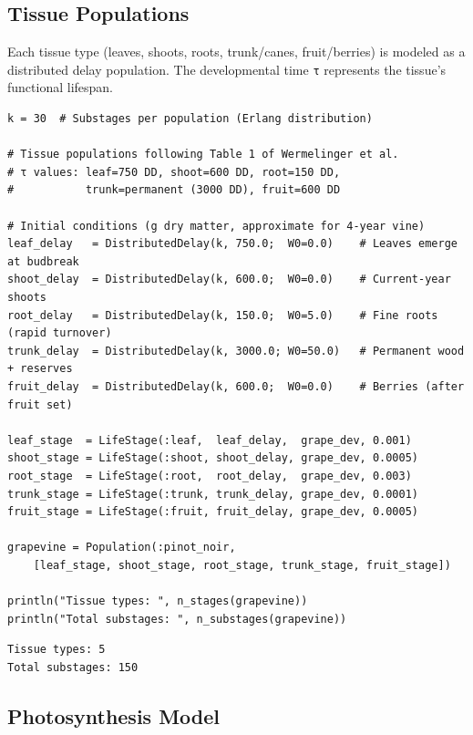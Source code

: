 \subsection{Tissue Populations}



\label{10442425031049001717}{}


Each tissue type (leaves, shoots, roots, trunk/canes, fruit/berries) is modeled as a distributed delay population. The developmental time \texttt{τ} represents the tissue’s functional lifespan.




\begin{verbatim}
k = 30  # Substages per population (Erlang distribution)

# Tissue populations following Table 1 of Wermelinger et al.
# τ values: leaf=750 DD, shoot=600 DD, root=150 DD,
#           trunk=permanent (3000 DD), fruit=600 DD

# Initial conditions (g dry matter, approximate for 4-year vine)
leaf_delay   = DistributedDelay(k, 750.0;  W0=0.0)    # Leaves emerge at budbreak
shoot_delay  = DistributedDelay(k, 600.0;  W0=0.0)    # Current-year shoots
root_delay   = DistributedDelay(k, 150.0;  W0=5.0)    # Fine roots (rapid turnover)
trunk_delay  = DistributedDelay(k, 3000.0; W0=50.0)   # Permanent wood + reserves
fruit_delay  = DistributedDelay(k, 600.0;  W0=0.0)    # Berries (after fruit set)

leaf_stage  = LifeStage(:leaf,  leaf_delay,  grape_dev, 0.001)
shoot_stage = LifeStage(:shoot, shoot_delay, grape_dev, 0.0005)
root_stage  = LifeStage(:root,  root_delay,  grape_dev, 0.003)
trunk_stage = LifeStage(:trunk, trunk_delay, grape_dev, 0.0001)
fruit_stage = LifeStage(:fruit, fruit_delay, grape_dev, 0.0005)

grapevine = Population(:pinot_noir,
    [leaf_stage, shoot_stage, root_stage, trunk_stage, fruit_stage])

println("Tissue types: ", n_stages(grapevine))
println("Total substages: ", n_substages(grapevine))
\end{verbatim}




\begin{verbatim}
Tissue types: 5
Total substages: 150
\end{verbatim}



\subsection{Photosynthesis Model}



